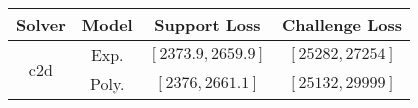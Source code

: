 \begin{tabular}{cc|c|c} 
\hline 
 Solver & Model & Support Loss  & Challenge Loss \tabularnewline\hline 
\hline 
\multirow{2}{*}{c2d} & Exp. & $\left[2373.9,2659.9\right]$ & $\left[25282,27254\right]$ \tabularnewline 
 & Poly. & $\left[2376,2661.1\right]$ & $\left[25132,29999\right]$ \tabularnewline 
\hline 
\end{tabular} 

